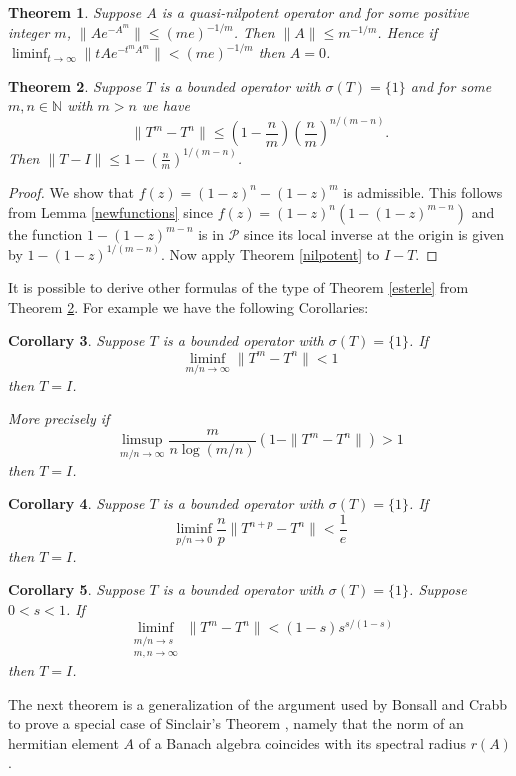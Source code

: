 \documentclass[12pt]{amsart}
\newtheorem{thm}{Theorem}[section]
\newtheorem{cor}[thm]{Corollary}
\begin{document}
\begin{thm} Suppose $A$ is a quasi-nilpotent operator and for some
positive integer $m$, $\|Ae^{-A^m}\|\le (me)^{-1/m}$.  Then
$\|A\|\le m^{-1/m}$.  Hence if
$\liminf_{t\to\infty}\|tAe^{-t^mA^m}\|<(me)^{-1/m}$ then $A=0$.
\end{thm}

\begin{thm}\label{esterle2} Suppose $T$ is a bounded operator with
$\sigma(T)=\{1\}$ and for some $m,n\in\mathbb N$ with $m>n$ we
have
$$\|T^m-T^n\|\le\left(1-\frac{n}{m}\right) \left(\frac{n}{m}\right)^{n/(m-n)}.$$  Then
$\|T-I\|\le 1-(\frac{n}{m})^{1/(m-n)}$.\end{thm}

\begin{proof} We show that $f(z)=(1-z)^n-(1-z)^m$ is admissible.
This follows from Lemma \ref{newfunctions} since $f(z)= (1-z)^n
(1-(1-z)^{m-n})$ and the function $1-(1-z)^{m-n}$ is in $\mathcal
P$ since its local inverse at the origin is given by
$1-(1-z)^{1/(m-n)}$.  Now apply Theorem \ref{nilpotent} to $I-T$.
\end{proof}

It is possible to derive  other formulas of the type of Theorem
\ref{esterle} from Theorem \ref{esterle2}.  For example we have
the following Corollaries:

\begin{cor}  Suppose $T$ is a bounded operator with
$\sigma(T)=\{1\}$. If $$ \liminf_{m/n\to\infty}\|T^m-T^n\|<1$$
then $T=I$.

More precisely if
$$ \limsup_{m/n\to\infty} \frac{m}{n\log(m/n)}(1-\|T^m-T^n\|)>1$$
then $T=I$.\end{cor}

\begin{cor}
Suppose $T$ is a bounded operator with $\sigma(T)=\{1\}$. If $$
\liminf_{p/n\to 0}\frac{n}{p}\|T^{n+p}-T^n\|<\frac1e$$ then $T=I$.
\end{cor}

\begin{cor}
Suppose $T$ is a bounded operator with $\sigma(T)=\{1\}$. Suppose
$0<s<1$. If
$$ \liminf_{\substack{m/n\to s\\ m,n\to\infty}}
\|T^{m}-T^n\|<(1-s)s^{s/(1-s)}$$ then
$T=I$.\end{cor}





The next theorem is a generalization of the argument used
by Bonsall and
Crabb \cite{bonsall-crabb}
to prove a special case of Sinclair's Theorem \cite{sinclair}, namely that
the norm of an hermitian element $A$ of a Banach algebra coincides
with its spectral radius $r(A)$.
\end{document}
